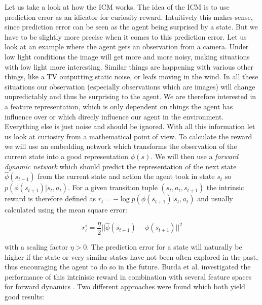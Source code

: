 Let us take a look at how the ICM works. The idea of the ICM is to use prediction error as an idicator for curiosity reward. Intuitively this makes sense, since prediction error can be seen as the agent being surprised by a state. But we have to be slightly more precise when it comes to this prediction error. Let us look at an example where the agent gets an observation from a camera. Under low light conditions the image will get more and more noisy, making situations with low light more interesting. Similar things are happening with various other things, like a TV outputting static noise, or leafs moving in the wind. In all these situations our observation (especially observations which are images) will change unpredictably and thus be surprising to the agent. We are therefore interested in a feature representation, which is only dependent on things the agent has influence over or which direcly influence our agent in the environment. Everything else is just noise and should be ignored. With all this information let us look at curiosity from a mathematical point of view. To calculate the reward we will use an embedding network which transforms the observation of the current state into a good representation $\phi(s)$. We will then use a \textit{forward dynamic network} which should predict the representation of the next state $\hat{\phi}(s_{t+1})$ from the current state and action the agent took in state $s_t$ so $p(\phi(s_{t+1})|s_t, a_t)$. For a given transition tuple $(s_t, a_t, s_{t+1})$ the intrinsic reward is therefore defined as $r_t = - \log p(\phi(s_{t+1})|s_t, a_t)$ and usually calculated using the mean square error:

\[r^i_t = \frac{\eta}{2}||\hat{\phi}(s_{t+1}) - \phi(s_{t+1})||^2\]

with a scaling factor $\eta > 0$. The prediction error for a state will naturally be higher if the state or very similar states have not been often explored in the past, thus encouraging the agent to do so in the future.   
Burda et al. investigated the performance of this intrinisic reward in combination with several feature spaces for forward dynamics \cite{burda2018large}. Two different approaches were found which both yield good results: 

